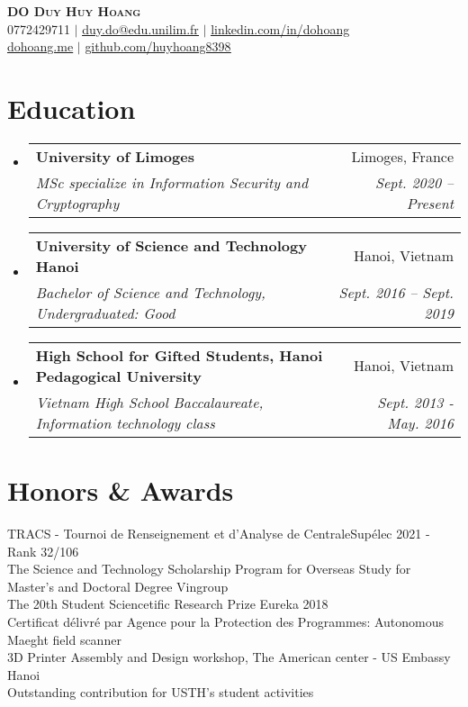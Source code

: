 \documentclass[letterpaper,11pt]{article}
\makeatletter
\newcommand{\resumeSubheading}[4]{
  \vspace{2pt}\item
    \begin{tabular*}{0.97\textwidth}[t]{l@{\extracolsep{\fill}}r}
      \textbf{#1} & #2 \\
      \textit{\small#3} & \textit{\small #4} \\
    \end{tabular*}\vspace{-7pt}
}
\newcommand{\resumeSubHeadingListStart}{\begin{itemize}[leftmargin=0.15in, label={}]}
\newcommand{\resumeSubHeadingListEnd}{\end{itemize}}
\makeatother
\begin{document}

\begin{center}
    \textbf{\Huge \scshape DO Duy Huy Hoang} \\ \vspace{1pt}
    \small 0772429711 $|$ \href{mailto:duy.do@etu.unilim.fr}{\underline{duy.do@edu.unilim.fr}} $|$ 
    \href{https://linkedin.com/in/dohoang}{\underline{linkedin.com/in/dohoang}}\\
    \href{https://dohoang.me}{\underline{dohoang.me}} $|$
    \href{https://github.com/huyhoang8398}{\underline{github.com/huyhoang8398}}
\end{center}

\section{Education}
  \resumeSubHeadingListStart
    \resumeSubheading
      {University of Limoges}{Limoges, France}
      {MSc specialize in Information Security and Cryptography}{Sept. 2020 -- Present}
    \resumeSubheading
      {University of Science and Technology Hanoi}{Hanoi, Vietnam}
      {Bachelor of Science and Technology, Undergraduated: Good}{Sept. 2016 -- Sept. 2019}
    \resumeSubheading
      {High School for Gifted Students, Hanoi Pedagogical University}{Hanoi, Vietnam}
      {Vietnam High School Baccalaureate, Information technology class}{Sept. 2013 - May. 2016}
  \resumeSubHeadingListEnd

\section{Honors \& Awards}
 \begin{itemize}[leftmargin=0.15in, label={}]
    \small{\item{
      {TRACS - Tournoi de Renseignement et d’Analyse de CentraleSupélec 2021 - Rank 32/106} \\
      {The Science and Technology Scholarship Program for Overseas Study for Master's and Doctoral Degree Vingroup}\\
      {The 20th Student Sciencetific Research Prize Eureka 2018}\\
      {Certificat délivré par Agence pour la Protection des Programmes: Autonomous Maeght field scanner}\\
      {3D Printer Assembly and Design workshop, The American center - US Embassy Hanoi}\\
      {Outstanding contribution for USTH's student activities}
    }}
 \end{itemize}
\end{document}
